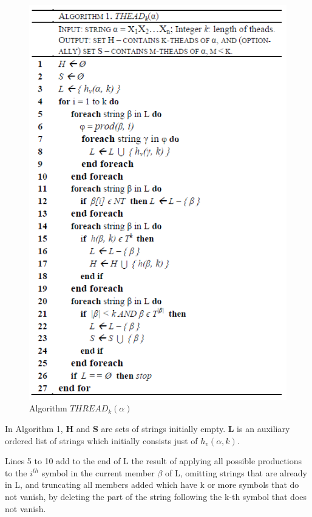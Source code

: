 \documentclass{sig-alternate-05-2015}
\begin{document}
\begin{figure}
\centering
\includegraphics[scale=0.65]{thead_algorithm.PNG}
\caption{Algorithm $THREAD_k(\alpha)$}
\label{fig:thead:algorithm}
\end{figure}

\bigskip
In Algorithm 1, \textbf{H} and \textbf{S} are sets of strings initially empty.
\textbf{L} is an auxiliary ordered list of strings which initially
consists just of $h_v(\alpha, k)$.

Lines 5 to 10 add to the end of L the result of applying
all possible productions to the $i^{th}$ symbol in the current
member $\beta$ of L, omitting strings that are already in L, and
truncating all members added which have k or more symbols
that do not vanish, by deleting the part of the string
following the k-th symbol that does not vanish.
\end{document}
